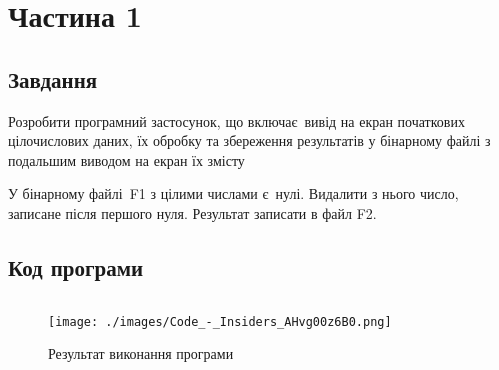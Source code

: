 \section{Частина 1}
\label{sec:task1}

\subsection{Завдання}
\label{subsec:task1_task}

Розробити програмний застосунок, що включає вивід
на екран початкових цілочислових даних, їх обробку та збереження
результатів у бінарному файлі з подальшим виводом на екран їх змісту

У бінарному файлі F1 з цілими числами є нулі.
Видалити з нього число, записане після першого нуля.
Результат записати в файл F2.

\subsection{Код програми}
\label{subsec:task1_code}
\inputminted{cpp}{../src/task1.cpp}

\begin{figure}[!ht]
    \centering
    \texttt{[image: ./images/Code\_-\_Insiders\_AHvg00z6B0.png]}
    \caption{Результат виконання програми}
    \label{fig:task1_exec}
\end{figure}
